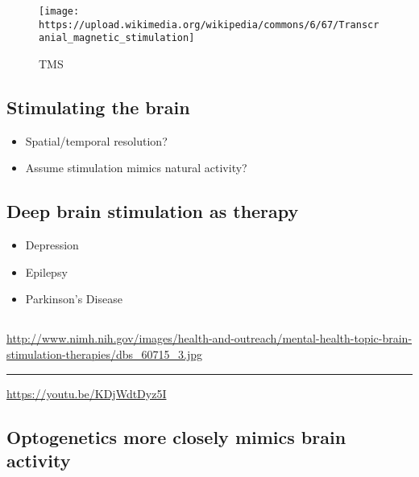 \documentclass[]{article}
\providecommand{\tightlist}{%
  \setlength{\itemsep}{0pt}\setlength{\parskip}{0pt}}
\begin{document}
\begin{figure}

{\centering \texttt{[image: https://upload.wikimedia.org/wikipedia/commons/6/67/Transcranial\_magnetic\_stimulation]} 

}

\caption{TMS}\label{fig:unnamed-chunk-1}
\end{figure}

\subsection{Stimulating the brain}\label{stimulating-the-brain-1}

\begin{itemize}
\tightlist
\item
  Spatial/temporal resolution?
\item
  Assume stimulation mimics natural activity?
\end{itemize}

\subsection{Deep brain stimulation as
therapy}\label{deep-brain-stimulation-as-therapy}

\begin{itemize}
\tightlist
\item
  Depression
\item
  Epilepsy
\item
  Parkinson's Disease
\end{itemize}

\subsection{}\label{section}

\url{http://www.nimh.nih.gov/images/health-and-outreach/mental-health-topic-brain-stimulation-therapies/dbs_60715_3.jpg}

\begin{center}\rule{0.5\linewidth}{\linethickness}\end{center}

\url{https://youtu.be/KDjWdtDyz5I}

\subsection{Optogenetics more closely mimics brain
activity}\label{optogenetics-more-closely-mimics-brain-activity}
\end{document}
